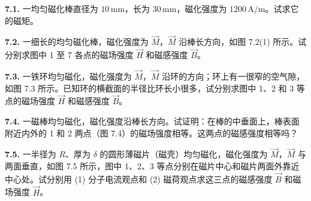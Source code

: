 \textbf{7.1.} 一均匀磁化棒直径为 $10\,\mathrm{mm}$，长为 $30\,\mathrm{mm}$，磁化强度为 $1200\,\mathrm{A/m}$。试求它的磁矩。

\vfill
\newpage

\textbf{7.2.} 一细长的均匀磁化棒，磁化强度为 $\vec{M}$，$\vec{M}$ 沿棒长方向，如图 7.2(1) 所示。试分别求图中 1 至 7 各点的磁场强度 $\vec{H}$ 和磁感强度 $\vec{B}$。

\begin{center}
\end{center}

\vfill
\newpage

\textbf{7.3.} 一铁环均匀磁化，磁化强度为 $\vec{M}$，$\vec{M}$ 沿环的方向；环上有一很窄的空气隙，如图 7.3 所示。已知环的横截面的半径比环长小很多，试分别求图中 1、2 和 3 等点的磁场强度 $\vec{H}$ 和磁感强度 $\vec{B}$。

\begin{center}
\end{center}

\vfill
\newpage

\textbf{7.4.} 一磁棒均匀磁化，磁化强度沿棒长方向。试证明：在棒的中垂面上，棒表面附近内外的 1 和 2 两点（图 7.4）的磁场强度相等。这两点的磁感强度相等吗？

\begin{center}
\end{center}

\vfill
\newpage

\textbf{7.5.} 一半径为 $R$、厚为 $\delta$ 的圆形薄磁片（磁壳）均匀磁化，磁化强度为 $\vec{M}$，$\vec{M}$ 与两面垂直，如图 7.5 所示，图中 1、2、3 等点分别在磁片中心和磁片两面外靠近中心处。试分别用 (1) 分子电流观点和 (2) 磁荷观点求这三点的磁感强度 $\vec{B}$ 和磁场强度 $\vec{H}$。

\begin{center}
  \begin{minipage}[b]{0.47\linewidth}
    \centering
  \end{minipage}\hfill
  \begin{minipage}[b]{0.47\linewidth}
    \centering
  \end{minipage}
\end{center}

\vfill
\newpage

